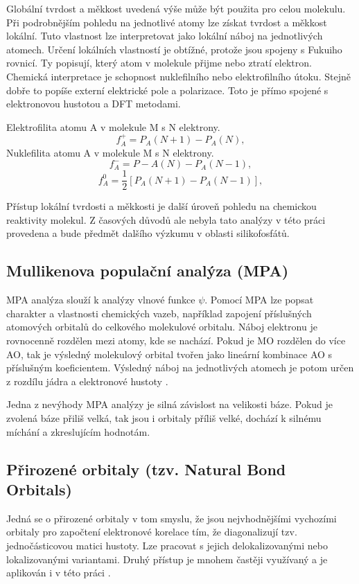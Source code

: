 \documentclass[
digital, %
table,   %
lof,     %
lot,     %
oneside,
]{fithesis3}
\begin{document}
Globální tvrdost a měkkost uvedená výše může být použita pro celou molekulu. Při podrobnějším pohledu na jednotlivé atomy lze získat tvrdost a měkkost lokální. Tuto vlastnost lze interpretovat jako lokální náboj na jednotlivých atomech. Určení lokálních vlastností je obtížné, protože jsou spojeny s Fukuiho rovnicí. Ty popisují, který atom v molekule přijme nebo ztratí elektron. Chemická interpretace je schopnost nuklefilního nebo elektrofilního útoku. Stejně dobře to popíše externí elektrické pole a polarizace. Toto je přímo spojené s elektronovou hustotou a DFT metodami.

Elektrofilita atomu A v molekule M s N elektrony.
\begin{equation}
f_A^+ = P_A(N+1) - P_A(N),
\end{equation}
Nuklefilita atomu A v molekule M s N elektrony.
\begin{equation}
f_A^- = P-A(N) - P_A(N-1),
\end{equation}
\begin{equation}
f_A^0 = \frac{1}{2}[P_A(N+1) - P_A(N-1)],
\end{equation}

Přístup lokální tvrdosti a měkkosti je další úroveň pohledu na chemickou reaktivity molekul. Z časových důvodů ale nebyla tato analýzy v této práci provedena a bude předmět dalšího výzkumu v oblasti silikofosfátů.

\subsection{Mullikenova populační analýza (MPA)}
MPA analýza slouží k analýzy vlnové funkce $\psi$. Pomocí MPA lze popsat charakter a vlastnosti chemických vazeb, například zapojení příslušných atomových orbitalů do celkového molekulové orbitalu. Náboj elektronu je rovnocenně rozdělen mezi atomy, kde se nachází. Pokud je MO rozdělen do více AO, tak je výsledný molekulový orbital tvořen jako lineární kombinace AO s příslušným koeficientem. Výsledný náboj na jednotlivých atomech je potom určen z rozdílu jádra a elektronové hustoty \cite{lowe2011quantum}.


Jedna z nevýhody MPA analýzy je silná závislost na velikosti báze. Pokud je zvolená báze přiliš velká, tak jsou i orbitaly příliš velké, dochází k silnému míchání a zkreslujícím hodnotám.

\subsection{Přirozené orbitaly (tzv. Natural Bond Orbitals)}
Jedná se o přirozené orbitaly v tom smyslu, že jsou nejvhodnějšími vychozími orbitaly pro započtení elektronové korelace tím, že diagonalizují tzv. jednočásticovou matici hustoty. Lze pracovat s jejich delokalizovanými nebo lokalizovanými variantami. Druhý přístup je mnohem častěji využívaný a je aplikován i v této práci \cite{weinhold2005valency}.
\end{document}
